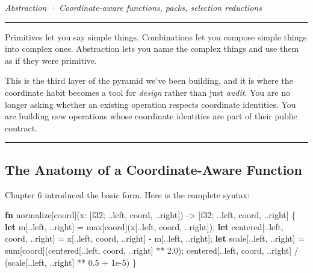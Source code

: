\documentclass[11pt,]{article}
\newenvironment{Shaded}{}{}
\newcommand{\DataTypeTok}[1]{\textcolor[rgb]{0.56,0.13,0.00}{#1}}
\newcommand{\DecValTok}[1]{\textcolor[rgb]{0.25,0.63,0.44}{#1}}
\newcommand{\KeywordTok}[1]{\textcolor[rgb]{0.00,0.44,0.13}{\textbf{#1}}}
\newcommand{\NormalTok}[1]{#1}
\newcommand{\OperatorTok}[1]{\textcolor[rgb]{0.40,0.40,0.40}{#1}}
\begin{document}
\emph{Abstraction · Coordinate-aware functions, packs, selection
reductions}

\begin{center}\rule{0.5\linewidth}{0.4pt}\end{center}

Primitives let you say simple things. Combinations let you compose
simple things into complex ones. Abstraction lets you name the complex
things and use them as if they were primitive.

This is the third layer of the pyramid we've been building, and it is
where the coordinate habit becomes a tool for \emph{design} rather than
just \emph{audit}. You are no longer asking whether an existing
operation respects coordinate identities. You are building new
operations whose coordinate identities are part of their public
contract.

\begin{center}\rule{0.5\linewidth}{0.4pt}\end{center}

\hypertarget{the-anatomy-of-a-coordinate-aware-function}{%
\subsection{The Anatomy of a Coordinate-Aware
Function}\label{the-anatomy-of-a-coordinate-aware-function}}

Chapter 6 introduced the basic form. Here is the complete syntax:

\begin{Shaded}
\begin{Highlighting}[]
\KeywordTok{fn}\NormalTok{ normalize[coord](x: }\OperatorTok{[}\DataTypeTok{f32}\NormalTok{; ..left, coord, ..right}\OperatorTok{]}\NormalTok{)}
\NormalTok{    -> }\OperatorTok{[}\DataTypeTok{f32}\NormalTok{; ..left, coord, ..right}\OperatorTok{]}
\OperatorTok{\{}
    \KeywordTok{let}\NormalTok{ m}\OperatorTok{[}\NormalTok{..left, ..right}\OperatorTok{]}\NormalTok{ = max}\OperatorTok{[}\NormalTok{coord}\OperatorTok{]}\NormalTok{(x}\OperatorTok{[}\NormalTok{..left, coord, ..right}\OperatorTok{]}\NormalTok{);}
    \KeywordTok{let}\NormalTok{ centered}\OperatorTok{[}\NormalTok{..left, coord, ..right}\OperatorTok{]}\NormalTok{ = x}\OperatorTok{[}\NormalTok{..left, coord, ..right}\OperatorTok{]}\NormalTok{ - m}\OperatorTok{[}\NormalTok{..left, ..right}\OperatorTok{]}\NormalTok{;}
    \KeywordTok{let}\NormalTok{ scale}\OperatorTok{[}\NormalTok{..left, ..right}\OperatorTok{]}\NormalTok{ = sum}\OperatorTok{[}\NormalTok{coord}\OperatorTok{]}\NormalTok{(centered}\OperatorTok{[}\NormalTok{..left, coord, ..right}\OperatorTok{]}\NormalTok{ ** }\DecValTok{2.0}\NormalTok{);}
\NormalTok{    centered}\OperatorTok{[}\NormalTok{..left, coord, ..right}\OperatorTok{]}\NormalTok{ / (scale}\OperatorTok{[}\NormalTok{..left, ..right}\OperatorTok{]}\NormalTok{ ** }\DecValTok{0.5}\NormalTok{ + }\DecValTok{1}\NormalTok{e-}\DecValTok{5}\NormalTok{)}
\OperatorTok{\}}
\end{Highlighting}
\end{Shaded}
\end{document}
